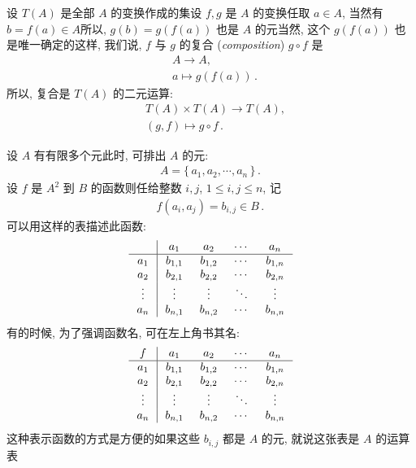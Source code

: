 \begin{definition}
    设 $T(A)$ 是全部 $A$ 的变换作成的集\period 设 $f,g$ 是 $A$ 的变换\period 任取 $a \in A$, 当然有 $b = f(a) \in A$\period 所以, $g(b) = g(f(a))$ 也是 $A$ 的元\period 当然, 这个 $g(f(a))$ 也是唯一确定的\period 这样, 我们说, $f$ 与 $g$ 的复合 (\textit{composition}) $g \circ f$ 是
    \begin{align*}
         & A \to A, \tag*{$g \circ f \colon$} \\
         & a \mapsto g(f(a)) \period
    \end{align*}
    所以, 复合是 $T(A)$ 的二元运算:
    \begin{align*}
         & T(A) \times T(A) \to T(A), \tag*{$\circ \colon$} \\
         & (g,f) \mapsto g \circ f \period
    \end{align*}
\end{definition}

\begin{remark}
    设 $A$ 有有限多个元\period 此时, 可排出 $A$ 的元:
    \begin{align*}
        A = \{\, a_1, a_2, \cdots, a_n \,\} \period
    \end{align*}
    设 $f$ 是 $A^2$ 到 $B$ 的函数\period 则任给整数 $i,j$, $1 \leq i,j \leq n$, 记
    \begin{align*}
        f(a_i, a_j) = b_{i,j} \in B \period
    \end{align*}
    可以用这样的表描述此函数:
    \begin{align*}
        \arraycolsep=0.25cm
        \begin{array}{c|cccc}
            \      & a_1     & a_2     & \cdots & a_n     \\ \hline
            a_1    & b_{1,1} & b_{1,2} & \cdots & b_{1,n} \\
            a_2    & b_{2,1} & b_{2,2} & \cdots & b_{2,n} \\
            \vdots & \vdots  & \vdots  & \ddots & \vdots  \\
            a_n    & b_{n,1} & b_{n,2} & \cdots & b_{n,n} \\
        \end{array}
    \end{align*}
    有的时候, 为了强调函数名, 可在左上角书其名:
    \begin{align*}
        \arraycolsep=0.25cm
        \begin{array}{c|cccc}
            f      & a_1     & a_2     & \cdots & a_n     \\ \hline
            a_1    & b_{1,1} & b_{1,2} & \cdots & b_{1,n} \\
            a_2    & b_{2,1} & b_{2,2} & \cdots & b_{2,n} \\
            \vdots & \vdots  & \vdots  & \ddots & \vdots  \\
            a_n    & b_{n,1} & b_{n,2} & \cdots & b_{n,n} \\
        \end{array}
    \end{align*}
    这种表示函数的方式是方便的\period 如果这些 $b_{i,j}$ 都是 $A$ 的元, 就说这张表是 $A$ 的运算表\period
\end{remark}

